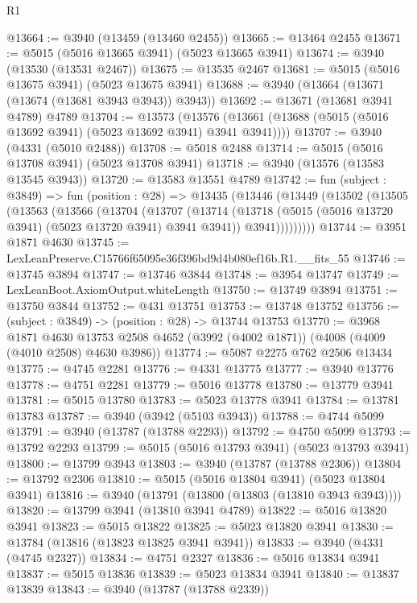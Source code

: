 \begin{lexlean}{R1}
\begin{coremodule}
@13664 := @3940 (@13459 (@13460 @2455))
@13665 := @13464 @2455
@13671 := @5015 (@5016 @13665 @3941) (@5023 @13665 @3941)
@13674 := @3940 (@13530 (@13531 @2467))
@13675 := @13535 @2467
@13681 := @5015 (@5016 @13675 @3941) (@5023 @13675 @3941)
@13688 := @3940 (@13664 (@13671 (@13674 (@13681 @3943 @3943)) @3943))
@13692 := @13671 (@13681 @3941 @4789) @4789
@13704 := @13573
    (@13576 (@13661 (@13688 (@5015 (@5016 @13692 @3941) (@5023 @13692 @3941) @3941 @3941))))
@13707 := @3940 (@4331 (@5010 @2488))
@13708 := @5018 @2488
@13714 := @5015 (@5016 @13708 @3941) (@5023 @13708 @3941)
@13718 := @3940 (@13576 (@13583 @13545 @3943))
@13720 := @13583 @13551 @4789
@13742 := fun (subject : @3849) =>
  fun (position : @28) =>
  @13435
    (@13446
      (@13449
        (@13502
          (@13505
            (@13563
              (@13566
                (@13704
                  (@13707
                    (@13714
                      (@13718 (@5015 (@5016 @13720 @3941) (@5023 @13720 @3941) @3941 @3941))
                      @3941)))))))))
@13744 := @3951 @1871 @4630
@13745 := LexLeanPreserve.C15766f65095e36f396bd9d4b080ef16b.R1.__fits_55
@13746 := @13745 @3894
@13747 := @13746 @3844
@13748 := @3954 @13747
@13749 := LexLeanBoot.AxiomOutput.whiteLength
@13750 := @13749 @3894
@13751 := @13750 @3844
@13752 := @431 @13751
@13753 := @13748 @13752
@13756 := (subject : @3849) -> (position : @28) -> @13744 @13753
@13770 := @3968
    @1871
    @4630
    @13753
    @2508
    @4652
    (@3992 (@4002 @1871))
    (@4008 (@4009 (@4010 @2508) @4630 @3986))
@13774 := @5087 @2275 @762 @2506 @13434
@13775 := @4745 @2281
@13776 := @4331 @13775
@13777 := @3940 @13776
@13778 := @4751 @2281
@13779 := @5016 @13778
@13780 := @13779 @3941
@13781 := @5015 @13780
@13783 := @5023 @13778 @3941
@13784 := @13781 @13783
@13787 := @3940 (@3942 (@5103 @3943))
@13788 := @4744 @5099
@13791 := @3940 (@13787 (@13788 @2293))
@13792 := @4750 @5099
@13793 := @13792 @2293
@13799 := @5015 (@5016 @13793 @3941) (@5023 @13793 @3941)
@13800 := @13799 @3943
@13803 := @3940 (@13787 (@13788 @2306))
@13804 := @13792 @2306
@13810 := @5015 (@5016 @13804 @3941) (@5023 @13804 @3941)
@13816 := @3940 (@13791 (@13800 (@13803 (@13810 @3943 @3943))))
@13820 := @13799 @3941 (@13810 @3941 @4789)
@13822 := @5016 @13820 @3941
@13823 := @5015 @13822
@13825 := @5023 @13820 @3941
@13830 := @13784 (@13816 (@13823 @13825 @3941 @3941))
@13833 := @3940 (@4331 (@4745 @2327))
@13834 := @4751 @2327
@13836 := @5016 @13834 @3941
@13837 := @5015 @13836
@13839 := @5023 @13834 @3941
@13840 := @13837 @13839
@13843 := @3940 (@13787 (@13788 @2339))

\end{coremodule}
\end{lexlean}
